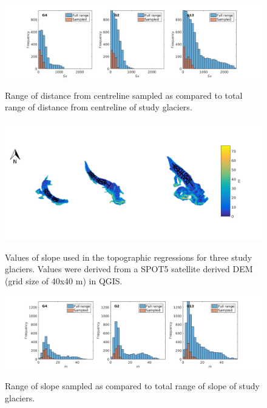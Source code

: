 \documentclass[12pt]{article}
\begin{document}
\begin{landscape}
\begin{figure}
	\centering
	\includegraphics[height = 0.4\textwidth]{SampledRangeTopo_centreD.png}\\
	\caption{Range of distance from centreline sampled as compared to total range of distance from centreline of study glaciers.}
	\label{sampledRange:centreD}
\end{figure}

\begin{figure}
	\centering
	\includegraphics[height = 0.4\textwidth]{Map_slope.png}\\
	\caption{Values of slope used in the topographic regressions for three study glaciers. Values were derived from a SPOT5 satellite derived DEM (grid size of 40x40 m) in QGIS.}
	\label{map:slope}
\end{figure}

\begin{figure}
	\centering
	\includegraphics[height = 0.4\textwidth]{SampledRangeTopo_slope.png}\\
	\caption{Range of slope sampled as compared to total range of slope of study glaciers.}
	\label{sampledRange:slope}
\end{figure}


\end{landscape}
\end{document}
